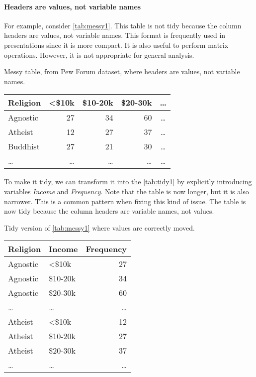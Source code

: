 \paragraph{Headers are values, not variable names}  For example, consider
\cref{tab:messy1}.  This table is not tidy because the column headers are values, not
variable names.  This format is frequently used in presentations since it is more compact.
It is also useful to perform matrix operations. However, it is not appropriate for general
analysis.

\begin{tablebox}[label=tab:messy1]{Messy table, from Pew Forum dataset, where headers are values, not variable names.}
  \centering
  \begin{tabular}{l r r r c}
    \toprule
    Religion & <\$10k & \$10-20k & \$20-30k & \dots \\
    \midrule
    Agnostic & 27 & 34 & 60 & \dots \\
    Atheist & 12 & 27 & 37 & \dots \\
    Buddhist & 27 & 21 & 30 & \dots \\
    \dots & \dots & \dots & \dots & \dots \\
    \bottomrule
  \end{tabular}
\end{tablebox}

To make it tidy, we can transform it into the \cref{tab:tidy1} by explicitly introducing
variables \emph{Income} and \emph{Frequency}.
Note that the table is now longer, but it is also narrower.  This is a common pattern when
fixing this kind of issue.  The table is now tidy because the column headers are variable
names, not values.

\begin{tablebox}[label=tab:tidy1]{Tidy version of \cref{tab:messy1} where values are correctly moved.}
  \centering
  \begin{tabular}{l l r}
    \toprule
    Religion & Income & Frequency \\
    \midrule
    Agnostic & <\$10k & 27 \\
    Agnostic & \$10-20k & 34 \\
    Agnostic & \$20-30k & 60 \\
    \dots & \dots & \dots \\
    Atheist & <\$10k & 12 \\
    Atheist & \$10-20k & 27 \\
    Atheist & \$20-30k & 37 \\
    \dots & \dots & \dots \\
    \bottomrule
  \end{tabular}
\end{tablebox}

